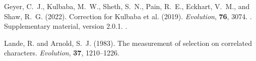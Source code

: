 \documentclass[11pt]{article}
\begin{document}
\begin{thebibliography}{}

Geyer, C.~J., Kulbaba, M.~W., Sheth, S.~N., Pain, R.~E., Eckhart, V.~M.,
    and Shaw, R.~G. (2022).
\newblock Correction for Kulbaba et al. (2019).
\newblock \emph{Evolution}, \textbf{76}, 3074.
\newblock {}.
\newblock Supplementary material, version 2.0.1.
\newblock {}.

Lande, R. and Arnold, S.~J. (1983).
\newblock The measurement of selection on correlated characters.
\newblock \emph{Evolution}, \textbf{37}, 1210--1226.

\end{thebibliography}
\end{document}
